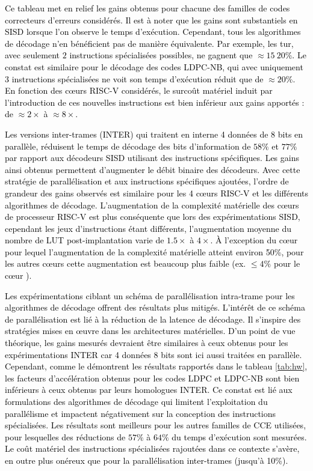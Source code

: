 \documentclass[../main.tex]{subfiles}
\begin{document}

\textcolor{black}{Ce tableau met en relief les gains obtenus pour chacune des familles de codes correcteurs d'erreurs considérés. 
Il est à noter que les gains sont substantiels en SISD lorsque l'on observe le temps d'exécution. 
Cependant, tous les algorithmes de décodage n'en bénéficient pas de manière équivalente. 
Par exemple, les \acrlong{tur}, avec seulement $2$ instructions spécialisées possibles, ne gagnent que $\approx 15~20\%$. 
Le constat est similaire pour le décodage des codes LDPC-NB, qui avec uniquement $3$ instructions spécialisées ne voit son temps d'exécution réduit que de $\approx 20\%$. 
En fonction des cœurs RISC-V considérés, le surcoût matériel induit par l'introduction de ces nouvelles instructions est bien inférieur aux gains apportés : de $\approx2\times$ à $\approx8\times$.}

\textcolor{black}{Les versions inter-trames (INTER) qui traitent en interne 4 données de 8 bits en parallèle, réduisent le temps de décodage des bits d'information de $58\%$ et $77\%$ par rapport aux décodeurs SISD utilisant des instructions spécifiques. 
Les gains ainsi obtenus permettent d'augmenter le débit binaire des décodeurs. 
Avec cette stratégie de parallélisation et aux instructions spécifiques ajoutées, l'ordre de grandeur des gains observés est similaire pour les 4 cœurs RISC-V et les différents algorithmes de décodage. 
L'augmentation de la complexité matérielle des cœurs de processeur RISC-V est plus conséquente que lors des expérimentations SISD, cependant les jeux d'instructions étant différents, l'augmentation moyenne du nombre de LUT post-implantation varie de $1.5\times$ à $4\times$. 
À l'exception du cœur \PicoRV\space pour lequel l'augmentation de la complexité matérielle atteint environ 50\%, pour les autres cœurs cette augmentation est beaucoup plus faible (ex. $\leq 4\%$ pour le cœur \RISCY).}

\textcolor{black}{Les expérimentations ciblant un schéma de parallélisation intra-trame pour les algorithmes de décodage offrent des résultats plus mitigés. 
L'intérêt de ce schéma de parallélisation est lié à la réduction de la latence de décodage. 
Il s'inspire des stratégies mises en œuvre dans les architectures matérielles. 
D'un point de vue théorique, les gains mesurés devraient être similaires à ceux obtenus pour les expérimentations INTER car 4 données 8 bits sont ici aussi traitées en parallèle. 
Cependant, comme le démontrent les résultats rapportés dans le tableau \ref{tab:hw}, les facteurs d'accélération obtenus pour les codes LDPC et LDPC-NB sont bien inférieurs à ceux obtenus par leurs homologues INTER. 
Ce constat est lié aux formulations des algorithmes de décodage qui limitent l'exploitation du parallélisme et impactent négativement sur la conception des instructions spécialisées. 
Les résultats sont meilleurs pour les autres familles de CCE utilisées, pour lesquelles des réductions de $57\%$ à $64\%$ du temps d'exécution sont mesurées. 
Le coût matériel des instructions spécialisées rajoutées dans ce contexte s'avère, en outre plus onéreux que pour la parallélisation inter-trames (jusqu'à 10\%).}
\end{document}
